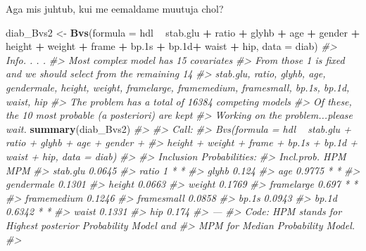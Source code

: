 \documentclass[]{book}
\newenvironment{Shaded}{\begin{snugshade}}{\end{snugshade}}
\newcommand{\KeywordTok}[1]{\textcolor[rgb]{0.13,0.29,0.53}{\textbf{#1}}}
\newcommand{\DataTypeTok}[1]{\textcolor[rgb]{0.13,0.29,0.53}{#1}}
\newcommand{\StringTok}[1]{\textcolor[rgb]{0.31,0.60,0.02}{#1}}
\newcommand{\CommentTok}[1]{\textcolor[rgb]{0.56,0.35,0.01}{\textit{#1}}}
\newcommand{\OperatorTok}[1]{\textcolor[rgb]{0.81,0.36,0.00}{\textbf{#1}}}
\newcommand{\NormalTok}[1]{#1}
\begin{document}
Aga mis juhtub, kui me eemaldame muutuja chol?

\begin{Shaded}
\begin{Highlighting}[]
\NormalTok{diab_Bvs2 <-}\StringTok{ }\KeywordTok{Bvs}\NormalTok{(}\DataTypeTok{formula =}\NormalTok{ hdl }\OperatorTok{~}\StringTok{ }\NormalTok{stab.glu }\OperatorTok{+}\StringTok{ }\NormalTok{ratio }\OperatorTok{+}\StringTok{ }\NormalTok{glyhb }\OperatorTok{+}\StringTok{ }\NormalTok{age }\OperatorTok{+}\StringTok{ }\NormalTok{gender }\OperatorTok{+}\StringTok{ }\NormalTok{height }\OperatorTok{+}\StringTok{ }\NormalTok{weight }\OperatorTok{+}\StringTok{ }\NormalTok{frame }\OperatorTok{+}\StringTok{ }\NormalTok{bp.1s }\OperatorTok{+}\StringTok{ }\NormalTok{bp.1d}\OperatorTok{+}\StringTok{ }\NormalTok{waist }\OperatorTok{+}\StringTok{ }\NormalTok{hip, }\DataTypeTok{data =}\NormalTok{ diab)}
\CommentTok{#> Info. . . .}
\CommentTok{#> Most complex model has 15 covariates}
\CommentTok{#> From those 1 is fixed and we should select from the remaining 14 }
\CommentTok{#> stab.glu, ratio, glyhb, age, gendermale, height, weight, framelarge, framemedium, framesmall, bp.1s, bp.1d, waist, hip}
\CommentTok{#> The problem has a total of 16384 competing models}
\CommentTok{#> Of these, the  10 most probable (a posteriori) are kept}
\CommentTok{#> Working on the problem...please wait.}
\KeywordTok{summary}\NormalTok{(diab_Bvs2)}
\CommentTok{#> }
\CommentTok{#> Call:}
\CommentTok{#> Bvs(formula = hdl ~ stab.glu + ratio + glyhb + age + gender + }
\CommentTok{#>     height + weight + frame + bp.1s + bp.1d + waist + hip, data = diab)}
\CommentTok{#> }
\CommentTok{#> Inclusion Probabilities:}
\CommentTok{#>             Incl.prob. HPM MPM}
\CommentTok{#> stab.glu        0.0645        }
\CommentTok{#> ratio                1   *   *}
\CommentTok{#> glyhb            0.124        }
\CommentTok{#> age             0.9775   *   *}
\CommentTok{#> gendermale      0.1301        }
\CommentTok{#> height          0.0663        }
\CommentTok{#> weight          0.1769        }
\CommentTok{#> framelarge       0.697   *   *}
\CommentTok{#> framemedium     0.1246        }
\CommentTok{#> framesmall      0.0858        }
\CommentTok{#> bp.1s           0.0943        }
\CommentTok{#> bp.1d           0.6342   *   *}
\CommentTok{#> waist           0.1331        }
\CommentTok{#> hip              0.174        }
\CommentTok{#> ---}
\CommentTok{#> Code: HPM stands for Highest posterior Probability Model and}
\CommentTok{#>  MPM for Median Probability Model.}
\CommentTok{#> }
\end{Highlighting}
\end{Shaded}
\end{document}
